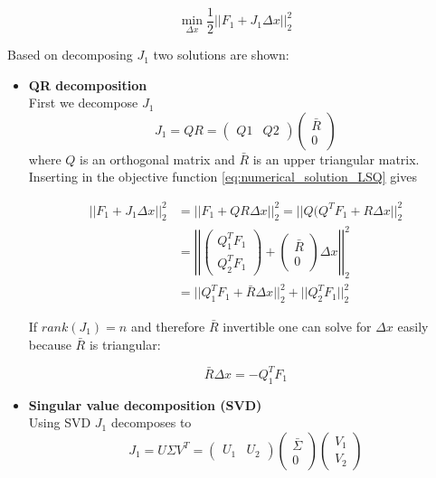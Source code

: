 \documentclass{scrartcl}[12pt, halfparskip]
\begin{document}
\begin{equation}
\min_{\Delta x} \frac{1}{2} || F_1 + J_1 \Delta x ||_2^2
\label{eq:numerical_solution_LSQ}
\end{equation}

Based on decomposing $J_1$ two solutions are shown:

\begin{itemize}
	\item \textbf{QR decomposition} \\
	First we decompose $J_1$
	\begin{equation}
		J_1 = Q R = 
		\begin{pmatrix}
			Q1 & Q2
		\end{pmatrix}
		\begin{pmatrix}
			\bar{R} \\
			0
		\end{pmatrix}
	\end{equation}
	where $Q$ is an orthogonal matrix and $\bar{R}$ is an upper triangular matrix. Inserting in the objective function \eqref{eq:numerical_solution_LSQ} gives
	
	\begin{align}
		|| F_1 + J_1 \Delta x ||_2^2 & = || F_1 + Q R \Delta x ||_2^2 = || Q( Q^T F_1 + R \Delta x ||_2^2 \\
		& = \left| \left| \begin{pmatrix}
		Q_1^T F_1 \\
		Q_2^T F_1
		\end{pmatrix} + 
		\begin{pmatrix}
		\bar{R} \\
		0
		\end{pmatrix}
		\Delta x \right| \right|_2^2 \nonumber \\
		& = || Q_1^T F_1 + \bar{R} \Delta x ||_2^2 + ||Q_2^T F_1 ||_2^2 \nonumber
	\end{align}
	
	If $rank(J_1)=n$ and therefore $\bar{R}$ invertible one can solve for $\Delta x$ easily because $\bar{R}$ is triangular:
	
	\begin{equation}
		\bar{R} \Delta x = -Q_1^T F_1
	\end{equation}
	
	\item \textbf{Singular value decomposition (SVD)} \\
	Using SVD $J_1$ decomposes to
	\begin{equation}
		J_1 = U \Sigma V^T =
		\begin{pmatrix}
			U_1 & U_2
		\end{pmatrix}
		\begin{pmatrix}
			\bar{\Sigma} \\
			0
		\end{pmatrix}
		\begin{pmatrix}
			V_1 \\
			V_2
		\end{pmatrix}
	\end{equation}
	

\end{itemize}
\end{document}
